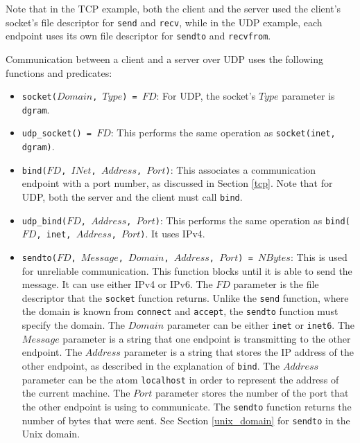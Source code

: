 Note that in the TCP example, both the client and the server used the client's socket's file descriptor for \texttt{send} and \texttt{recv}, while in the UDP example, each endpoint uses its own file descriptor for \texttt{sendto} and \texttt{recvfrom}.

Communication between a client and a server over UDP uses the following functions and predicates: 

\begin{itemize}
\item \texttt{socket($Domain$, $Type$) = $FD$}: For UDP, the socket's $Type$ parameter is \texttt{dgram}.
\item \texttt{udp\_socket() = $FD$}: This performs the same operation as \texttt{socket(inet, dgram)}.
\item \texttt{bind($FD$, $INet$, $Address$, $Port$)}: This associates a communication endpoint with a port number, as discussed in Section \ref{tcp}.  Note that for UDP, both the server and the client must call \texttt{bind}. 
\item \texttt{udp\_bind($FD$, $Address$, $Port$)}: This performs the same operation as \texttt{bind($FD$, inet, $Address$, $Port$)}.  It uses IPv4.
\item \texttt{sendto($FD$, $Message$, $Domain$, $Address$, $Port$) = $NBytes$}: This is used for unreliable communication.  This function blocks until it is able to send the message.  It can use either IPv4 or IPv6.  The $FD$ parameter is the file descriptor that the \texttt{socket} function returns.  Unlike the \texttt{send} function, where the domain is known from \texttt{connect} and \texttt{accept}, the \texttt{sendto} function must specify the domain.  The $Domain$ parameter can be either \texttt{inet} or \texttt{inet6}.  The $Message$ parameter is a string that one endpoint is transmitting to the other endpoint.  The $Address$ parameter is a string that stores the IP address of the other endpoint, as described in the explanation of \texttt{bind}.  The $Address$ parameter can be the atom \texttt{localhost} in order to represent the address of the current machine.  The $Port$ parameter stores the number of the port that the other endpoint is using to communicate.  The \texttt{sendto} function returns the number of bytes that were sent.  See Section \ref{unix_domain} for \texttt{sendto} in the Unix domain.

\end{itemize}
